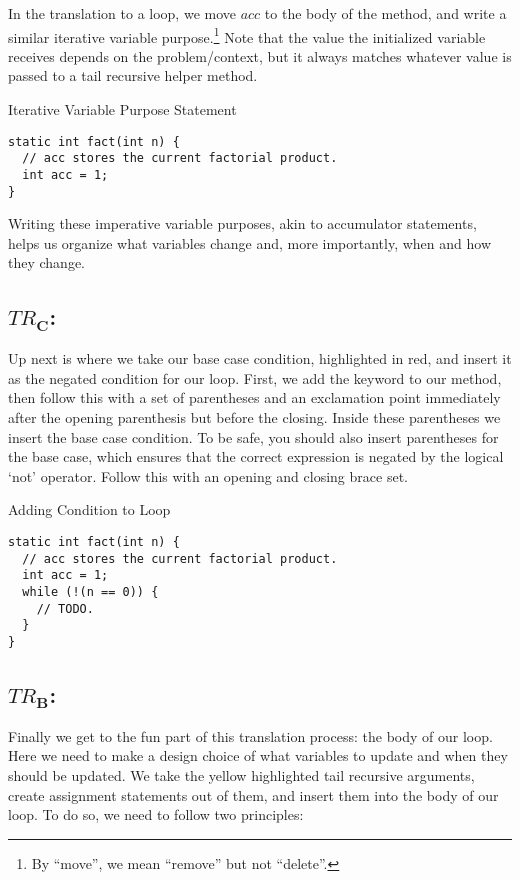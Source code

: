 In the translation to a loop, we move $\textit{acc}$ to the body of the method, and write a similar iterative variable purpose.\footnote{By ``move'', we mean ``remove'' but not ``delete''.} Note that the value the initialized variable receives depends on the problem/context, but it always matches whatever value is passed to a tail recursive helper method.

\begin{cl}[]{Iterative Variable Purpose Statement}
\begin{lstlisting}[language=MyJava]
static int fact(int n) {
  // acc stores the current factorial product. 
  int acc = 1;
}
\end{lstlisting}
\end{cl}

Writing these imperative variable purposes, akin to accumulator statements, helps us organize what variables change and, more importantly, when and how they change. 

\subsection*{\textit{$TR_\mathbf{C}$}:} Up next is where we take our base case condition, highlighted in red, and insert it as the negated condition for our loop. First, we add the  keyword to our method, then follow this with a set of parentheses and an exclamation point immediately after the opening parenthesis but before the closing. Inside these parentheses we insert the base case condition. To be safe, you should also insert parentheses for the base case, which ensures that the correct expression is negated by the logical `not' operator. Follow this with an opening and closing brace set.

\begin{cl}[]{Adding Condition to Loop}
\begin{lstlisting}[language=MyJava]
static int fact(int n) {
  // acc stores the current factorial product. 
  int acc = 1;
  while (!(n == 0)) { 
    // TODO.
  }
}
\end{lstlisting}
\end{cl}

\subsection*{\textit{$TR_\mathbf{B}$}:} Finally we get to the fun part of this translation process: the body of our loop. Here we need to make a design choice of what variables to update and when they should be updated. We take the \textcolor{darkyellow}{yellow} highlighted tail recursive arguments, create assignment statements out of them, and insert them into the body of our loop. To do so, we need to follow two principles:

